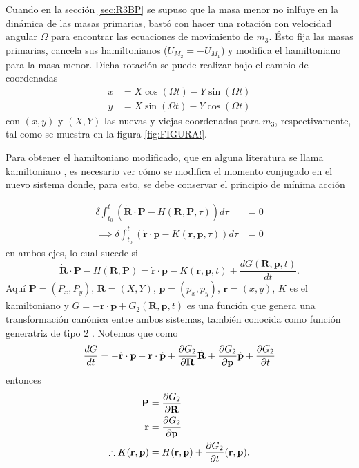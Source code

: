 Cuando en la sección \ref{sec:R3BP} se supuso que la masa menor no inlfuye en la dinámica de las masas primarias, bastó con hacer una rotación con velocidad angular $\Omega$ para encontrar las ecuaciones de movimiento de $m_3$. Ésto fija las masas primarias, cancela sus hamiltonianos ($  U_{M_2} = - U_{M_1}$) y modifica el hamiltoniano para la masa menor. Dicha rotación se puede realizar bajo el cambio de coordenadas
\begin{align*}
 x &= X\cos (\Omega t) - Y \sin (\Omega t) \\
 y &= X\sin (\Omega t) - Y \cos (\Omega t) 
\end{align*} 
con $(x,y)$ y $(X,Y)$ las nuevas y viejas coordenadas para $m_3$, respectivamente, tal como se muestra en la figura \ref{fig:FIGURA!}.


Para obtener el hamiltoniano modificado, que en alguna literatura se llama kamiltoniano \cite{Goldstein2007, Johns2011}, es necesario ver cómo se modifica el momento conjugado en el nuevo sistema donde, para esto, se debe conservar el principio de mínima acción

\begin{align}
 \delta \int_{t_0}^t \left( \dot{\mathbf{R}} \cdot \mathbf{P} - H(\mathbf{R}, \mathbf{P}, \tau) \right) d\tau &= 0 \nonumber \\
\implies \delta \int_{t_0}^t \left( \dot{\mathbf{r}} \cdot \mathbf{p} - K(\mathbf{r}, \mathbf{p}, \tau) \right) d\tau &= 0
 \label{eq:kamiltonian_condition}
\end{align}
en ambos ejes, lo cual sucede si
\begin{equation}
 \dot{\mathbf{R}} \cdot \mathbf{P} - H(\mathbf{R}, \mathbf{P}) = \dot{\mathbf{r}} \cdot \mathbf{p} - K(\mathbf{r}, \mathbf{p}, t) + \frac{dG(\mathbf{R}, \mathbf{p}, t)}{dt}.
\end{equation}
Aquí $\mathbf{P} = (P_x,P_y)$, $\mathbf{R} = (X,Y)$, $\mathbf{p} = (p_x,p_y)$, $\mathbf{r} = (x,y)$, $K$ es el kamiltoniano y $G = - \mathbf{r} \cdot \mathbf{p} + G_2(\mathbf{R}, \mathbf{p}, t)$ es una función que genera una transformación canónica entre ambos sistemas, también conocida como función generatriz de tipo 2 \cite{CanonicalTransformations}. Notemos que como 
\begin{align*}
 \frac{dG}{dt} =  - \dot{\mathbf{r}}\cdot \mathbf{p} - \mathbf{r}\cdot \dot{\mathbf{p}} + \frac{\partial G_2}{\partial \mathbf{R}}\dot{\mathbf{R}} + \frac{\partial G_2}{\partial \mathbf{p}}\dot{\mathbf{p}} + \frac{\partial G_2}{\partial t}
\end{align*}
entonces
\begin{align}
 \mathbf{P} &= \frac{\partial G_2}{\partial \mathbf{R}} \nonumber \\
 \mathbf{r} &= \frac{\partial G_2}{\partial \mathbf{p}} \nonumber \\
 \therefore K(\mathbf{r}, \mathbf{p}) &= H(\mathbf{r}, \mathbf{p}) + \frac{\partial G_2}{\partial t} (\mathbf{r}, \mathbf{p}).
 \label{eq:kamiltonian_formulae}
\end{align}

